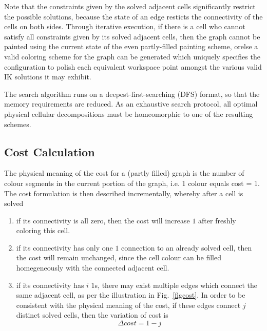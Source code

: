 \documentclass[journal]{IEEEtran}
\begin{document}
Note that the constraints given by the solved adjacent cells significantly restrict the possible solutions, 
because the state of an edge resticts the connectivity of the cells on both sides. 
Through iterative execution, if there is a cell who cannot satisfy all constraints given by its solved adjacent cells, then the graph cannot be painted using the current state of the even partly-filled painting scheme, orelse a valid coloring scheme for the graph can be generated which uniquely specifies the configuration to polish each equivalent workspace point amongst the various valid IK solutions it may exhibit. 

The search algorithm runs on a deepest-first-searching (DFS) format, so that the memory requirements are reduced. 
As an exhaustive search protocol, all optimal physical cellular decompositions must be homeomorphic to one of the resulting schemes.

\subsection{Cost Calculation}
The physical meaning of the cost for a (partly filled) graph is the number of colour segments in the current portion of the graph, 
i.e. 1 colour equals cost = 1.
The cost formulation is then described incrementally, whereby after a cell is solved
\begin{enumerate}
\item if its connectivity is all zero, then the cost will increase $1$ after freshly coloring this cell.
\item if its connectivity has only one $1$ connection to an already solved cell, then the cost will remain unchanged, since the cell colour can be filled homegeneously with the connected adjacent cell. 
\item if its connectivity has $i$ $1$s, there may exist multiple edges which connect the same adjacent cell, as per the illustration 
in Fig.~\ref{figcost}. In order to be consistent with the physical meaning of the cost, 
if these edges connect $j$ distinct solved cells, then the variation of cost is 
\begin{equation}
\Delta cost = 1-j
\label{eq:cost}
\end{equation}
\end{enumerate}
\end{document}
